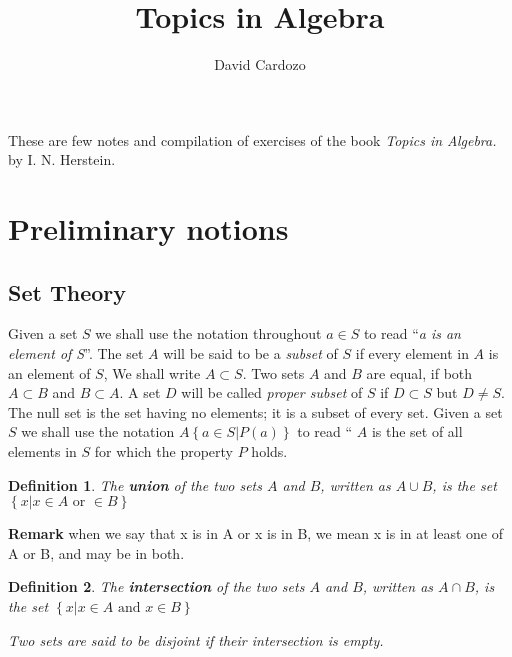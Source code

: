 \documentclass[11pt,a4paper]{article}
\author{David Cardozo}
\title{Topics in Algebra}
\newtheorem{define}{Definition}
\begin{document}
\maketitle

These are few notes and compilation of exercises of the book \textit{Topics in Algebra.} by I. N. Herstein.
\section{Preliminary notions}
\subsection{Set Theory}
Given a set $S$ we shall use the notation throughout $a \in S$ to read ``\emph{a is an element of S}''. The set $A$ will be said to be a \emph{subset} of $S$ if every element in $A$ is an element of $S$, We shall write $ A  \subset S$. Two sets $A$ and $B$ are equal, if both $ A  \subset B$ and $B \subset A$. A set $D$ will be called \emph{proper subset} of $S$ if $D \subset S$ but $ D \neq S$. The null set is the set having no elements; it is a subset of every set. Given a set $S$ we shall use the notation $A \left\lbrace a \in S \vert P(a)\right\rbrace $ to read `` $A$ is the set of all elements in $S$ for which the property $P$ holds.
\begin{define}
The \textbf{union} of the two sets $A$ and $B$, written as $A \cup B$, is the set $ \left\lbrace x \vert x \in A \text{ or } \in B \right\rbrace$
\end{define}
\textbf{Remark}  when we say that x is in A or x is in B, we mean x is in at least one of A or B, and may be in both.
\begin{define}
The \textbf{intersection} of the two sets $A$ and $B$, written as $ A \cap B$, is the set $ \left\lbrace x \vert x \in A \text{ and } x \in B \right\rbrace $

Two sets are said to be \emph{disjoint} if their intersection is empty.
\end{define}
\end{document}
